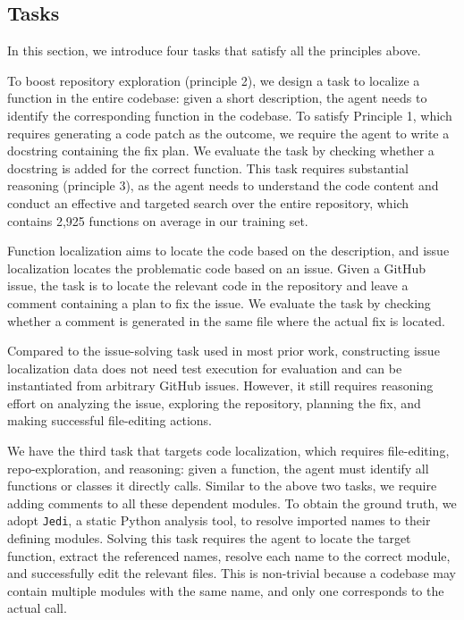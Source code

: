 \subsection{\hybridmethodname Tasks}
\label{sec:tasks}

In this section, we introduce four \hybridmethodname tasks that satisfy all the principles above.

To boost repository exploration (principle 2), we design a task to localize a function in the entire codebase:
given a short description, the agent needs to identify the corresponding function in the codebase.
To satisfy Principle 1, which requires generating a code patch as the outcome, we require the agent to write a docstring containing the fix plan. 
We evaluate the task by checking whether a docstring is added for the correct function.
This task requires substantial reasoning (principle 3), as the agent needs to understand the code content and conduct an effective and targeted search over the entire repository, which contains 2,925 functions on average in our training set.

Function localization aims to locate the code based on the description, and issue localization locates the problematic code based on an issue.
Given a GitHub issue, the task is to locate the relevant code in the repository and leave a comment containing a plan to fix the issue.
We evaluate the task by checking whether a comment is generated in the same file where the actual fix is located. 

Compared to the issue-solving task used in most prior work, constructing issue localization data does not need test execution for evaluation and can be instantiated from arbitrary GitHub issues.
However, it still requires reasoning effort on analyzing the issue, exploring the repository, planning the fix, and making successful file-editing actions.

We have the third task that targets code localization, which requires file-editing, repo-exploration, and reasoning: given a function, the agent must identify all functions or classes it directly calls.
Similar to the above two tasks, we require adding comments to all these dependent modules.
To obtain the ground truth, we adopt \texttt{Jedi}, a static Python analysis tool, to resolve imported names to their defining modules.
Solving this task requires the agent to locate the target function, extract the referenced names, resolve each name to the correct module, and successfully edit the relevant files.
This is non-trivial because a codebase may contain multiple modules with the same name, and only one corresponds to the actual call.

